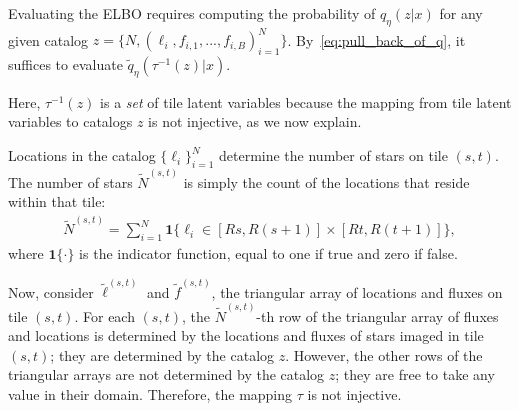 

\noindent Evaluating
the ELBO requires computing the probability of 
$q_\eta(z | x)$
for any given catalog $z = \{N, (\ell_i, f_{i,1}, ..., f_{i,B})_{i = 1}^N\}$. 
By~\eqref{eq:pull_back_of_q}, 
it suffices to evaluate $\tilde q_\eta(\tau^{-1}(z) | x)$. 

Here, $\tau^{-1}(z)$ is a {\itshape set} of tile latent variables because the mapping from tile latent variables to catalogs $z$ is not injective, as we now explain.  

Locations in the catalog $\{\ell_i\}_{i=1}^N$
determine the number of stars on tile $(s,t)$. 
The number of stars $\tilde N^{(s,t)}$ is simply the count of the locations that reside within that tile:
\begin{align}
\tilde N^{(s,t)} = \sum_{i=1}^N 
\mathbf 1 \Big\{\ell_i\in [Rs, R(s+1)] \times [Rt, R(t+1)]\Big\},
\end{align}
where $\mathbf{1}\{\cdot\}$ is the indicator function, equal to one if true and zero if false.

Now, consider $\tilde\ell^{(s, t)}$ and $\tilde f^{(s, t)}$, the triangular array of locations and fluxes on tile $(s,t)$. 
For each $(s,t)$, the $\tilde N^{(s,t)}$-th row 
of the triangular array of fluxes and locations is
determined by the locations and fluxes of stars imaged in tile $(s,t)$; they are determined by the catalog $z$. However, the other rows 
of the triangular arrays are not determined by 
the catalog $z$; they are free to take any value in their domain. Therefore, the mapping $\tau$ is not injective. 

